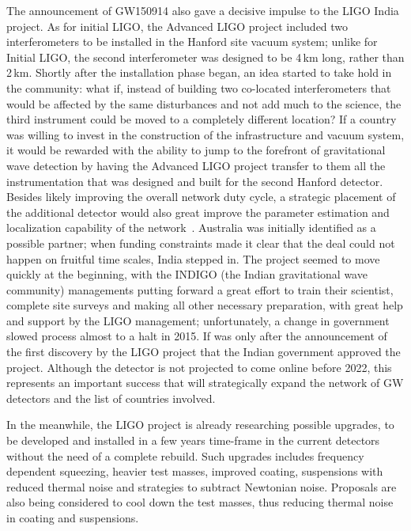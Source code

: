 The announcement of GW150914 also gave a decisive impulse to the LIGO India project. As for initial LIGO, the Advanced LIGO project included two interferometers to be installed in the Hanford site vacuum system; unlike for Initial LIGO, the second interferometer was designed to be 4\,km long, rather than 2\,km. Shortly after the installation phase began, an idea started to take hold in the community: what if, instead of building two co-located interferometers that would be affected by the same disturbances and not add much to the science, the third instrument could be moved to a completely different location? If a country was willing to invest in the construction of the infrastructure and vacuum system, it would be rewarded with the ability to jump to the forefront of gravitational wave detection by having the Advanced LIGO project transfer to them all the instrumentation that was designed and built for the second Hanford detector. Besides likely improving the overall network duty cycle, a strategic placement of the additional detector would also great improve the parameter estimation and localization capability of the network~\cite{something}.
Australia was initially identified as a possible partner; when funding constraints made it clear that the deal could not happen on fruitful time scales, India stepped in. The project seemed to move quickly at the beginning, with the INDIGO (the Indian gravitational wave community) managements putting forward a great effort to train their scientist, complete site surveys and making all other necessary preparation, with great help and support by the LIGO management; unfortunately, a change in government slowed process almost to a halt in 2015. If was only after the announcement of the first discovery by the LIGO project that the Indian government approved the project. Although the detector is not projected to come online before 2022, this represents an important success that will strategically expand the network of GW detectors and the list of countries involved.

In the meanwhile, the LIGO project is already researching possible upgrades, to be developed and installed in a few years time-frame in the current detectors without the need of a complete rebuild. Such upgrades includes frequency dependent squeezing, heavier test masses, improved coating, suspensions with reduced thermal noise and strategies to subtract Newtonian noise. Proposals are also being considered to cool down the test masses, thus reducing thermal noise in coating and suspensions.

